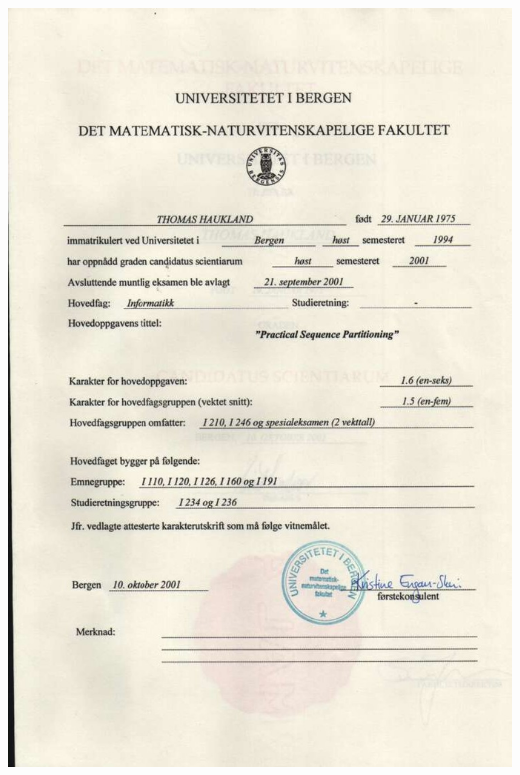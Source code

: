 \documentclass[10pt]{article}
\begin{document}
\includegraphics[width=\textwidth]{"master"} 
\end{document}
